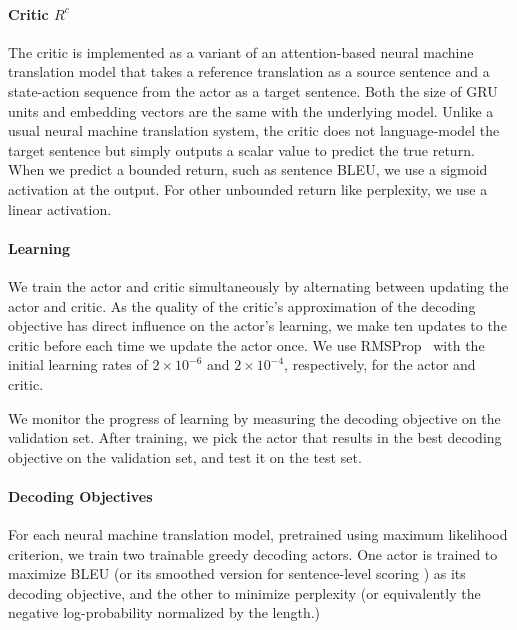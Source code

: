 \paragraph{Critic $R^c$}

The critic is implemented as a variant of an attention-based neural machine translation model that takes a reference translation as a source sentence and a state-action sequence from the actor as a target sentence. Both the size of GRU units and embedding vectors are the same with the underlying model.  Unlike a usual neural machine translation system, the critic does not language-model the target sentence but simply outputs a scalar value to predict the true return. When we predict a bounded return, such as sentence BLEU, we use a sigmoid activation at the output. For other unbounded return like perplexity, we use a linear activation.
\paragraph{Learning}

We train the actor and critic simultaneously by alternating between updating the actor and critic. As the quality of the critic's approximation of the decoding objective has direct influence on the actor's learning, we make ten updates to the critic before each time we update the actor once. We use RMSProp~\citep{tieleman2012lecture} with the initial learning rates of $2\times 10^{-6}$ and $2\times 10^{-4}$, respectively, for the actor and critic. 

We monitor the progress of learning by measuring the decoding objective on the validation set. After training, we pick the actor that results in the best decoding objective on the validation set, and test it on the test set.



\paragraph{Decoding Objectives}

For each neural machine translation model, pretrained using maximum likelihood criterion, we train two trainable greedy decoding actors. One actor is trained to maximize BLEU (or its smoothed version for sentence-level scoring \citep{lin2004automatic}) as its decoding objective, and the other to minimize perplexity (or equivalently the negative log-probability normalized by the length.) %

